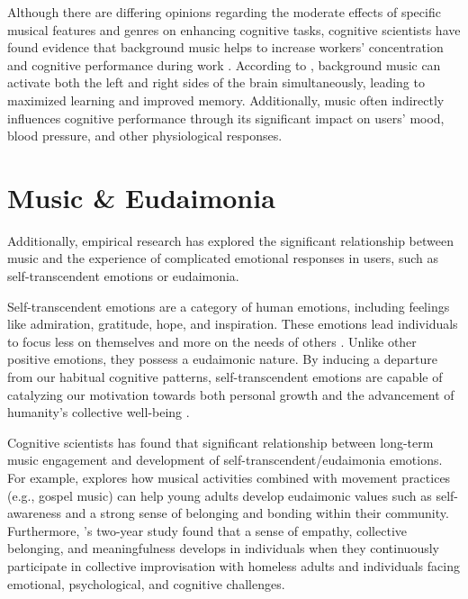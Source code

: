 \documentclass[
]{book}
\begin{document}
Although there are differing opinions regarding the moderate effects of specific musical features and genres on enhancing cognitive tasks, cognitive scientists have found evidence that background music helps to increase workers' concentration and cognitive performance during work \citep[e.g.,][]{Huang2011EffectsOB, NationalUniversity2021}. According to \citet{NationalUniversity2021}, background music can activate both the left and right sides of the brain simultaneously, leading to maximized learning and improved memory. Additionally, music often indirectly influences cognitive performance through its significant impact on users' mood, blood pressure, and other physiological responses.

\hypertarget{music-eudaimonia}{%
\section{Music \& Eudaimonia}\label{music-eudaimonia}}

Additionally, empirical research has explored the significant relationship between music and the experience of complicated emotional responses in users, such as self-transcendent emotions or eudaimonia.

Self-transcendent emotions are a category of human emotions, including feelings like admiration, gratitude, hope, and inspiration. These emotions lead individuals to focus less on themselves and more on the needs of others \citep[e.g.,][]{felnhofer2013game, stellar2017self, vancappellen2013positive}. Unlike other positive emotions, they possess a eudaimonic nature. By inducing a departure from our habitual cognitive patterns, self-transcendent emotions are capable of catalyzing our motivation towards both personal growth and the advancement of humanity's collective well-being \citep{algoe2009witnessing}.

Cognitive scientists has found that significant relationship between long-term music engagement and development of self-transcendent/eudaimonia emotions. For example,
\citet{nijs2021flourishing} explores how musical activities combined with movement practices (e.g., gospel music) can help young adults develop eudaimonic values such as self-awareness and a strong sense of belonging and bonding within their community. Furthermore, \citet{verneert2021space}'s two-year study found that a sense of empathy, collective belonging, and meaningfulness develops in individuals when they continuously participate in collective improvisation with homeless adults and individuals facing emotional, psychological, and cognitive challenges.
\end{document}
